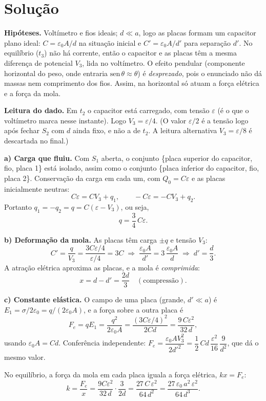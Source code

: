 \documentclass{article}%
\begin{document}
\section*{Solução}

\textbf{Hipóteses.} Voltímetro e fios ideais; $d\ll a$, logo as placas formam um capacitor plano ideal: $C=\varepsilon_0A/d$ na situação inicial e $C'=\varepsilon_0A/d'$ para separação $d'$. No equilíbrio ($t_3$) não há corrente, então o capacitor e as placas têm a mesma diferença de potencial $V_3$, lida no voltímetro. O efeito pendular (componente horizontal do peso, onde entraria $\mathrm{sen}\,\theta\approx\theta$) é \emph{desprezado}, pois o enunciado não dá massas nem comprimento dos fios. Assim, na horizontal só atuam a força elétrica e a força da mola.

\textbf{Leitura do dado.} Em $t_2$ o capacitor está carregado, com tensão $\varepsilon$ (é o que o voltímetro marca nesse instante). Logo $V_3=\varepsilon/4$. (O valor $\varepsilon/2$ é a tensão logo após fechar $S_2$ com $d$ ainda fixo, e não a de $t_2$. A leitura alternativa $V_3=\varepsilon/8$ é descartada no final.)

\textbf{a) Carga que fluiu.} Com $S_1$ aberta, o conjunto \{placa superior do capacitor, fio, placa 1\} está isolado, assim como o conjunto \{placa inferior do capacitor, fio, placa 2\}. Conservação da carga em cada um, com $Q_0=C\varepsilon$ e as placas inicialmente neutras:
\[
C\varepsilon=CV_3+q_1,\qquad -C\varepsilon=-CV_3+q_2 .
\]
Portanto $q_1=-q_2=q=C(\varepsilon-V_3)$, ou seja,
\[
\boxed{q=\frac{3}{4}\,C\varepsilon}.
\]

\textbf{b) Deformação da mola.} As placas têm carga $\pm q$ e tensão $V_3$:
\[
C'=\frac{q}{V_3}=\frac{3C\varepsilon/4}{\varepsilon/4}=3C
\;\Rightarrow\; \frac{\varepsilon_0A}{d'}=3\,\frac{\varepsilon_0A}{d}\;\Rightarrow\; d'=\frac d3 .
\]
A atração elétrica aproxima as placas, e a mola é \emph{comprimida}:
\[
\boxed{x=d-d'=\frac{2d}{3}}\quad(\text{compressão}).
\]

\textbf{c) Constante elástica.} O campo de uma placa (grande, $d'\ll a$) é $E_1=\sigma/2\varepsilon_0=q/(2\varepsilon_0A)$, e a força sobre a outra placa é
\[
F_e=qE_1=\frac{q^2}{2\varepsilon_0A}=\frac{(3C\varepsilon/4)^2}{2Cd}=\frac{9\,C\varepsilon^2}{32\,d},
\]
usando $\varepsilon_0A=Cd$. Conferência independente: $F_e=\dfrac{\varepsilon_0AV_3^2}{2d'^2}=\dfrac12\,Cd\,\dfrac{\varepsilon^2}{16}\,\dfrac{9}{d^2}$, que dá o mesmo valor.

No equilíbrio, a força da mola em cada placa iguala a força elétrica, $kx=F_e$:
\[
k=\frac{F_e}{x}=\frac{9C\varepsilon^2}{32\,d}\cdot\frac{3}{2d}=\boxed{\frac{27\,C\,\varepsilon^2}{64\,d^2}=\frac{27\,\varepsilon_0\,a^2\,\varepsilon^2}{64\,d^3}}.
\]
\end{document}
